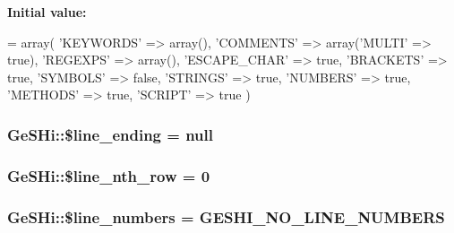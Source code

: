 {\bfseries Initial value\-:}
\begin{DoxyCode}
= array(
        \textcolor{stringliteral}{'KEYWORDS'} =>    array(),
        \textcolor{stringliteral}{'COMMENTS'} =>    array(\textcolor{stringliteral}{'MULTI'} => \textcolor{keyword}{true}),
        \textcolor{stringliteral}{'REGEXPS'} =>     array(),
        \textcolor{stringliteral}{'ESCAPE\_CHAR'} => \textcolor{keyword}{true},
        \textcolor{stringliteral}{'BRACKETS'} =>    \textcolor{keyword}{true},
        \textcolor{stringliteral}{'SYMBOLS'} =>     \textcolor{keyword}{false},
        \textcolor{stringliteral}{'STRINGS'} =>     \textcolor{keyword}{true},
        \textcolor{stringliteral}{'NUMBERS'} =>     \textcolor{keyword}{true},
        \textcolor{stringliteral}{'METHODS'} =>     \textcolor{keyword}{true},
        \textcolor{stringliteral}{'SCRIPT'} =>      \textcolor{keyword}{true}
    )
\end{DoxyCode}
\hypertarget{class_ge_s_hi_a736705b66eb05e8890b7b09479ee1b84}{
\subsubsection[{\$line\-\_\-ending}]{\setlength{\rightskip}{0pt plus 5cm}Ge\-S\-Hi\-::\$line\-\_\-ending = null}}\label{class_ge_s_hi_a736705b66eb05e8890b7b09479ee1b84}
\hypertarget{class_ge_s_hi_a87b747beb648bba71458a213f65b912e}{
\subsubsection[{\$line\-\_\-nth\-\_\-row}]{\setlength{\rightskip}{0pt plus 5cm}Ge\-S\-Hi\-::\$line\-\_\-nth\-\_\-row = 0}}\label{class_ge_s_hi_a87b747beb648bba71458a213f65b912e}
\hypertarget{class_ge_s_hi_a4cb044f6b765a6749817761a8597b9e7}{
\subsubsection[{\$line\-\_\-numbers}]{\setlength{\rightskip}{0pt plus 5cm}Ge\-S\-Hi\-::\$line\-\_\-numbers = {\bf G\-E\-S\-H\-I\-\_\-\-N\-O\-\_\-\-L\-I\-N\-E\-\_\-\-N\-U\-M\-B\-E\-R\-S}}}\label{class_ge_s_hi_a4cb044f6b765a6749817761a8597b9e7}

